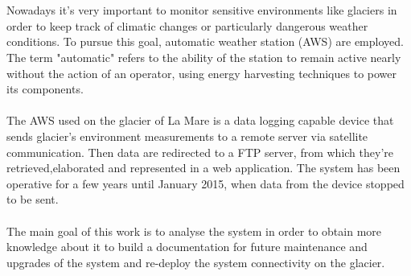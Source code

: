 \section*{}
\paragraph{}
Nowadays it's very important to monitor sensitive environments like glaciers in order to keep track of climatic changes or particularly dangerous weather conditions. To pursue this goal, automatic weather station (AWS) are employed. The term "automatic" refers to the ability of the station to remain active nearly without the action of an operator, using energy harvesting techniques to power its components.
\paragraph{}
The AWS used on the glacier of La Mare is a data logging capable device that sends glacier's environment measurements to a remote server via satellite communication. Then data are redirected to a FTP server, from which they're retrieved,elaborated and represented in a web application. The system has been operative for a few years until January 2015, when data from the device stopped to be sent.
\paragraph{}
The main goal of this work is to analyse the system in order to obtain more knowledge about it to build a documentation for future maintenance and upgrades of the system and re-deploy the system connectivity on the glacier.
\clearpage